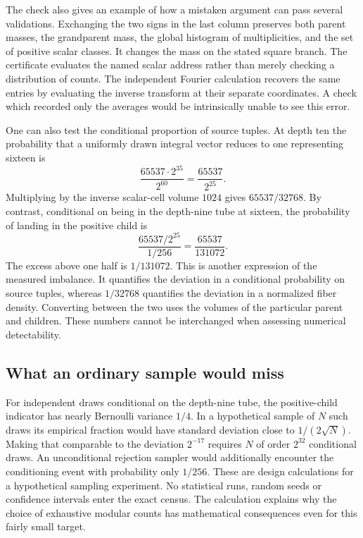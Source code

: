 \documentclass[12pt,letterpaper]{article}
\begin{document}
The check also gives an example of how a mistaken argument can pass several validations. Exchanging the two signs in the last column preserves both parent masses, the grandparent mass, the global histogram of multiplicities, and the set of positive scalar classes. It changes the mass on the stated square branch. The certificate evaluates the named scalar address rather than merely checking a distribution of counts. The independent Fourier calculation recovers the same entries by evaluating the inverse transform at their separate coordinates. A check which recorded only the averages would be intrinsically unable to see this error.

One can also test the conditional proportion of source tuples. At depth ten the probability that a uniformly drawn integral vector reduces to one representing sixteen is
\[
      \frac{65537\cdot2^{35}}{2^{60}}=\frac{65537}{2^{25}}.
\]
Multiplying by the inverse scalar-cell volume $1024$ gives $65537/32768$. By contrast, conditional on being in the depth-nine tube at sixteen, the probability of landing in the positive child is
\[
     \frac{65537/2^{25}}{1/256}=\frac{65537}{131072}.
\]
The excess above one half is $1/131072$. This is another expression of the measured imbalance. It quantifies the deviation in a conditional probability on source tuples, whereas $1/32768$ quantifies the deviation in a normalized fiber density. Converting between the two uses the volumes of the particular parent and children. These numbers cannot be interchanged when assessing numerical detectability.

\subsection{What an ordinary sample would miss}
For independent draws conditional on the depth-nine tube, the positive-child indicator has nearly Bernoulli variance $1/4$. In a hypothetical sample of $N$ such draws its empirical fraction would have standard deviation close to $1/(2\sqrt N)$. Making that comparable to the deviation $2^{-17}$ requires $N$ of order $2^{32}$ conditional draws. An unconditional rejection sampler would additionally encounter the conditioning event with probability only $1/256$. These are design calculations for a hypothetical sampling experiment. No statistical runs, random seeds or confidence intervals enter the exact census. The calculation explains why the choice of exhaustive modular counts has mathematical consequences even for this fairly small target.
\end{document}

